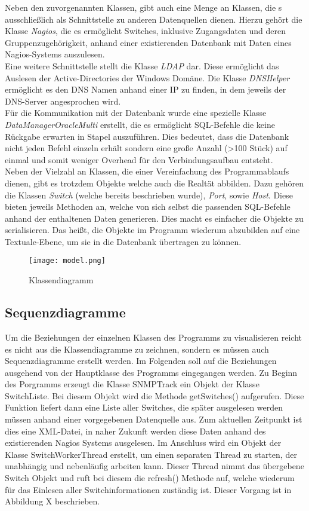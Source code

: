 Neben den zuvorgenannten Klassen, gibt auch eine Menge an Klassen, die s ausschließlich als Schnittstelle zu anderen Datenquellen dienen.
Hierzu gehört die Klasse \textit{Nagios}, die es ermöglicht Switches, inklusive Zugangsdaten und deren Gruppenzugehörigkeit, anhand einer existierenden Datenbank mit Daten eines Nagios-Systems auszulesen.\\
Eine weitere Schnittstelle stellt die Klasse \textit{LDAP} dar. Diese ermöglicht das Auslesen der Active-Directories der Windows Domäne.
Die Klasse \textit{DNSHelper} ermöglicht es den DNS Namen anhand einer IP zu finden, in dem jeweils der DNS-Server angesprochen wird.\\
Für die Kommunikation mit der Datenbank wurde eine spezielle Klasse \textit{DataManagerOracleMulti} erstellt, die es ermöglicht SQL-Befehle die keine Rückgabe erwarten in Stapel auszuführen.
Dies bedeutet, dass die Datenbank nicht jeden Befehl einzeln erhält sondern eine große Anzahl (>100 Stück) auf einmal und somit weniger Overhead für den Verbindungsaufbau entsteht.\\
Neben der Vielzahl an Klassen, die einer Vereinfachung des Programmablaufs dienen, gibt es trotzdem Objekte welche auch die Realtät abbilden.
Dazu gehören die Klassen \textit{Switch} (welche bereits beschrieben wurde), \textit{Port}, sowie \textit{Host}.
Diese bieten jeweils Methoden an, welche von sich selbst die passenden SQL-Befehle anhand der enthaltenen Daten generieren. Dies macht es einfacher die Objekte zu serialisieren.
Das heißt, die Objekte im Programm wiederum abzubilden auf eine Textuale-Ebene, um sie in die Datenbank übertragen zu können.\\

\begin{figure}[H]
\centering
\texttt{[image: model.png]}
\caption{Klassendiagramm}
\label{fig:classdiagram}
\end{figure}

\subsection{Sequenzdiagramme}
\label{subsec:seqdiagrams}

Um die Beziehungen der einzelnen Klassen des Programms zu visualisieren reicht es nicht aus die Klassendiagramme zu zeichnen, sondern es müssen auch Sequenzdiagramme erstellt werden.
Im Folgenden soll auf die Beziehungen ausgehend von der Hauptklasse des Programms eingegangen werden.
Zu Beginn des Porgramms erzeugt die Klasse SNMPTrack ein Objekt der Klasse SwitchListe.
Bei diesem Objekt wird die Methode getSwitches() aufgerufen. Diese Funktion liefert dann eine Liste aller Switches, die später ausgelesen werden müssen anhand einer vorgegebenen Datenquelle aus. Zum aktuellen Zeitpunkt ist dies eine XML-Datei, in naher Zukunft werden diese Daten anhand des existierenden Nagios Systems ausgelesen. Im Anschluss wird ein Objekt der Klasse SwitchWorkerThread erstellt, um einen separaten Thread zu starten, der unabhängig und nebenläufig arbeiten kann. Dieser Thread nimmt das übergebene Switch Objekt und ruft bei diesem die refresh() Methode auf, welche wiederum für das Einlesen aller Switchinformationen zuständig ist. Dieser Vorgang ist in Abbildung X beschrieben.


